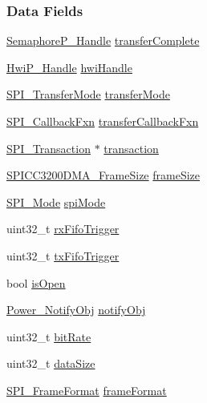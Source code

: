 \subsubsection*{Data Fields}
\begin{DoxyCompactItemize}
\item 
\hyperlink{_semaphore_p_8h_a7f34865f33e666455692544e5f12d1f2}{Semaphore\+P\+\_\+\+Handle} \hyperlink{struct_s_p_i_c_c3200_d_m_a___object_a73675ea9a579a13b4e83e73c1c61d661}{transfer\+Complete}
\item 
\hyperlink{_hwi_p_8h_a7dd325ff62af296374efc6d317f5e368}{Hwi\+P\+\_\+\+Handle} \hyperlink{struct_s_p_i_c_c3200_d_m_a___object_ae7c722f51caa93fb50f36d71f21f41e3}{hwi\+Handle}
\item 
\hyperlink{_s_p_i_8h_ab9ea76c6529d6076eee5e1c4a5a92c6f}{S\+P\+I\+\_\+\+Transfer\+Mode} \hyperlink{struct_s_p_i_c_c3200_d_m_a___object_a4568c8868e1afad459d799a4f8e8f061}{transfer\+Mode}
\item 
\hyperlink{_s_p_i_8h_a207e2d5a7e7ea5606b6995b6485ca015}{S\+P\+I\+\_\+\+Callback\+Fxn} \hyperlink{struct_s_p_i_c_c3200_d_m_a___object_a72099476a5531e0574c54b8ff03f973c}{transfer\+Callback\+Fxn}
\item 
\hyperlink{struct_s_p_i___transaction}{S\+P\+I\+\_\+\+Transaction} $\ast$ \hyperlink{struct_s_p_i_c_c3200_d_m_a___object_a6209f560b11300ad4b7d1dd6301faca7}{transaction}
\item 
\hyperlink{_s_p_i_c_c3200_d_m_a_8h_a886c3ca11a73823e4f3ab5eefc0fbebb}{S\+P\+I\+C\+C3200\+D\+M\+A\+\_\+\+Frame\+Size} \hyperlink{struct_s_p_i_c_c3200_d_m_a___object_a0eaf0b8282c07151b12ea19e5bd614be}{frame\+Size}
\item 
\hyperlink{_s_p_i_8h_a60a7e3d74577b38aa79ea6983362f942}{S\+P\+I\+\_\+\+Mode} \hyperlink{struct_s_p_i_c_c3200_d_m_a___object_a36697b1cbbbd6c4e5bfc79c76c7d6f91}{spi\+Mode}
\item 
uint32\+\_\+t \hyperlink{struct_s_p_i_c_c3200_d_m_a___object_aa78f596cf5149949066cda9c7f3af3d8}{rx\+Fifo\+Trigger}
\item 
uint32\+\_\+t \hyperlink{struct_s_p_i_c_c3200_d_m_a___object_a3c19a543c67b06c6da805c3bc4704212}{tx\+Fifo\+Trigger}
\item 
bool \hyperlink{struct_s_p_i_c_c3200_d_m_a___object_a77470787fc1b5ff28bed24d4be19b3d2}{is\+Open}
\item 
\hyperlink{struct_power___notify_obj}{Power\+\_\+\+Notify\+Obj} \hyperlink{struct_s_p_i_c_c3200_d_m_a___object_aa643f9072d5728259dafcdc5bc39aec8}{notify\+Obj}
\item 
uint32\+\_\+t \hyperlink{struct_s_p_i_c_c3200_d_m_a___object_ac06da517357ffa8af98f15a46ee0ecb0}{bit\+Rate}
\item 
uint32\+\_\+t \hyperlink{struct_s_p_i_c_c3200_d_m_a___object_a015d3da4084ada318ba5e2acd981cf76}{data\+Size}
\item 
\hyperlink{_s_p_i_8h_a4e1f33555dfa8147205af5b266f3a489}{S\+P\+I\+\_\+\+Frame\+Format} \hyperlink{struct_s_p_i_c_c3200_d_m_a___object_a0f26d83fb3015a5b297953b364c9ee2e}{frame\+Format}
\end{DoxyCompactItemize}


